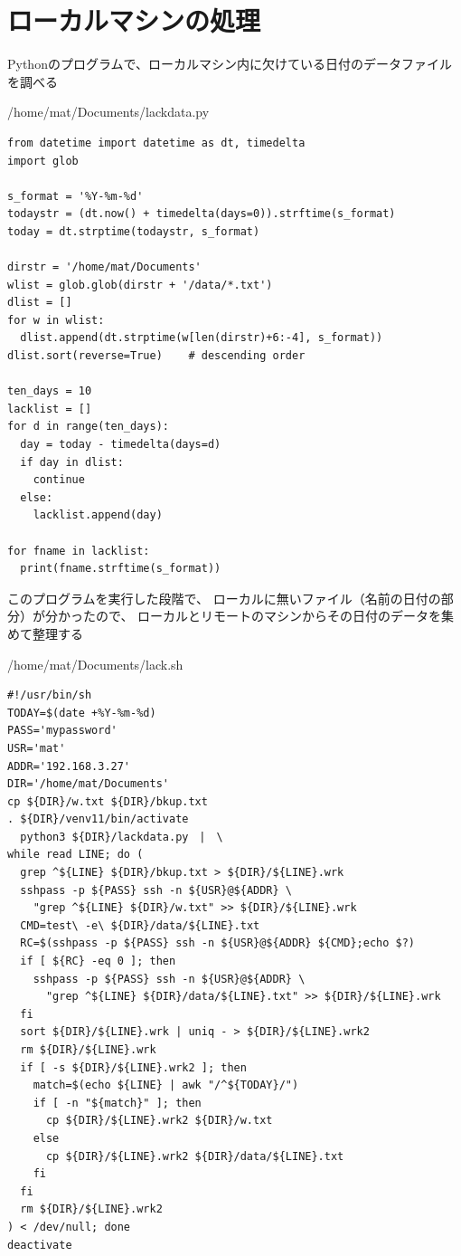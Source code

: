\documentclass[12pt,a4paper,uplatex]{jsbook}
\begin{document}
\newpage

\section{ローカルマシンの処理}

Pythonのプログラムで、ローカルマシン内に欠けている日付のデータファイルを調べる

\begin{itembox}[l]{/home/mat/Documents/lackdata.py}
	\begin{verbatim}
from datetime import datetime as dt, timedelta
import glob

s_format = '%Y-%m-%d'
todaystr = (dt.now() + timedelta(days=0)).strftime(s_format)
today = dt.strptime(todaystr, s_format)

dirstr = '/home/mat/Documents'
wlist = glob.glob(dirstr + '/data/*.txt')
dlist = []
for w in wlist:
  dlist.append(dt.strptime(w[len(dirstr)+6:-4], s_format))
dlist.sort(reverse=True)	# descending order

ten_days = 10
lacklist = []
for d in range(ten_days):
  day = today - timedelta(days=d)
  if day in dlist:
    continue
  else:
    lacklist.append(day)

for fname in lacklist:
  print(fname.strftime(s_format))
	\end{verbatim}
\end{itembox}

このプログラムを実行した段階で、
ローカルに無いファイル（名前の日付の部分）が分かったので、
ローカルとリモートのマシンからその日付のデータを集めて整理する
\begin{itembox}[l]{/home/mat/Documents/lack.sh}
	\begin{verbatim}
#!/usr/bin/sh
TODAY=$(date +%Y-%m-%d)
PASS='mypassword'
USR='mat'
ADDR='192.168.3.27'
DIR='/home/mat/Documents'
cp ${DIR}/w.txt ${DIR}/bkup.txt
. ${DIR}/venv11/bin/activate
  python3 ${DIR}/lackdata.py　|　\
while read LINE; do (
  grep ^${LINE} ${DIR}/bkup.txt > ${DIR}/${LINE}.wrk
  sshpass -p ${PASS} ssh -n ${USR}@${ADDR} \
    "grep ^${LINE} ${DIR}/w.txt" >> ${DIR}/${LINE}.wrk
  CMD=test\ -e\ ${DIR}/data/${LINE}.txt
  RC=$(sshpass -p ${PASS} ssh -n ${USR}@${ADDR} ${CMD};echo $?)
  if [ ${RC} -eq 0 ]; then
    sshpass -p ${PASS} ssh -n ${USR}@${ADDR} \
      "grep ^${LINE} ${DIR}/data/${LINE}.txt" >> ${DIR}/${LINE}.wrk
  fi
  sort ${DIR}/${LINE}.wrk | uniq - > ${DIR}/${LINE}.wrk2
  rm ${DIR}/${LINE}.wrk
  if [ -s ${DIR}/${LINE}.wrk2 ]; then
    match=$(echo ${LINE} | awk "/^${TODAY}/")
    if [ -n "${match}" ]; then
      cp ${DIR}/${LINE}.wrk2 ${DIR}/w.txt
    else
      cp ${DIR}/${LINE}.wrk2 ${DIR}/data/${LINE}.txt
    fi
  fi
  rm ${DIR}/${LINE}.wrk2
) < /dev/null; done
deactivate
	\end{verbatim}
\end{itembox}
\end{document}
